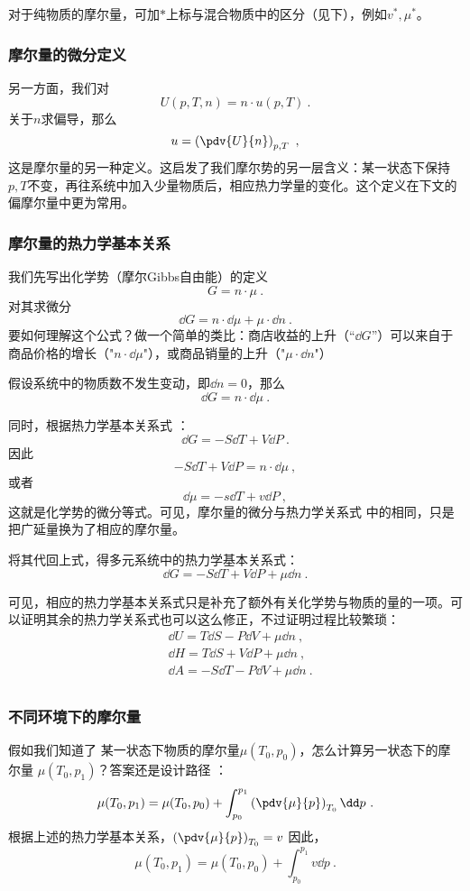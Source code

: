 对于纯物质的摩尔量，可加$*$上标与混合物质中的区分（见下），例如$v^*, \mu^*$。

\subsubsection{摩尔量的微分定义}
另一方面，我们对
$$U(p, T, n) = n \cdot u (p, T)~.$$
关于$n$求偏导，那么
$$u = \left( \pdv{U}{n} \right)_{p,T}~,$$
这是摩尔量的另一种定义。这启发了我们摩尔势的另一层含义：某一状态下保持$p,T$不变，再往系统中加入少量物质后，相应热力学量的变化。这个定义在下文的偏摩尔量中更为常用。

\subsubsection{摩尔量的热力学基本关系}

我们先写出化学势（摩尔Gibbs自由能）的定义
$$G = n \cdot \mu~.$$
对其求微分
$$\dd G = n \cdot \dd \mu +  \mu \cdot\dd n~.$$
要如何理解这个公式？做一个简单的类比：商店收益的上升（“$\dd G$”）可以来自于商品价格的增长（"$n \cdot \dd \mu$"），或商品销量的上升（"$\mu \cdot \dd n$"）

假设系统中的物质数不发生变动，即$\dd n = 0$，那么
$$\dd G = n \cdot \dd \mu~.$$

同时，根据热力学基本关系式 ：
$$\dd G = -S \dd T + V \dd P~.$$
因此
$$-S \dd T + V \dd P = n \cdot \dd \mu~,$$
或者
$$
\dd \mu = -s \dd T + v \dd P~,
$$
这就是化学势的微分等式。可见，摩尔量的微分与热力学关系式 中的相同，只是把广延量换为了相应的摩尔量。

将其代回上式，得多元系统中的热力学基本关系式：
$$\dd G = -S \dd T + V \dd P + \mu \dd n~.$$

可见，相应的热力学基本关系式只是补充了额外有关化学势与物质的量的一项。可以证明其余的热力学关系式也可以这么修正，不过证明过程比较繁琐：
$$
\begin{aligned}
&\dd U = T \dd S - P \dd V + \mu \dd n~,\\
&\dd H = T \dd S + V \dd P + \mu \dd n~,\\
&\dd A = -S \dd T - P \dd V + \mu \dd n~.\\
\end{aligned}
$$

\subsubsection{不同环境下的摩尔量}
假如我们知道了 某一状态下物质的摩尔量$\mu(T_0,p_0)$，怎么计算另一状态下的摩尔量 $\mu(T_0,p_1)$？答案还是设计路径 ：
$$\mu(T_0,p_1) = \mu(T_0,p_0) + \int_{p_0}^{p_1} \left( \pdv{\mu}{p} \right)_{T_0} \dd p~.$$
根据上述的热力学基本关系，$\left( \pdv{\mu}{p} \right)_{T_0} = v$
因此，$$\mu(T_0,p_1) = \mu(T_0,p_0) + \int_{p_0}^{p_1} v \dd p~.$$

